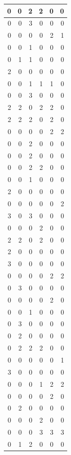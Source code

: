 \documentclass[
  12pt,
]{krantz}
\begin{document}
\begin{tabular}{r|r|r|r|r|r}
\hline
0 & 0 & 2 & 2 & 0 & 0\\
\hline
0 & 0 & 3 & 0 & 0 & 0\\
\hline
0 & 0 & 0 & 0 & 2 & 1\\
\hline
0 & 0 & 1 & 0 & 0 & 0\\
\hline
0 & 1 & 1 & 0 & 0 & 0\\
\hline
2 & 0 & 0 & 0 & 0 & 0\\
\hline
0 & 0 & 1 & 1 & 1 & 0\\
\hline
0 & 0 & 3 & 0 & 0 & 0\\
\hline
2 & 2 & 0 & 2 & 2 & 0\\
\hline
2 & 2 & 2 & 0 & 2 & 0\\
\hline
0 & 0 & 0 & 0 & 2 & 2\\
\hline
0 & 0 & 2 & 0 & 0 & 0\\
\hline
0 & 0 & 2 & 0 & 0 & 0\\
\hline
0 & 0 & 2 & 2 & 0 & 0\\
\hline
0 & 0 & 1 & 0 & 0 & 0\\
\hline
2 & 0 & 0 & 0 & 0 & 0\\
\hline
0 & 0 & 0 & 0 & 0 & 2\\
\hline
3 & 0 & 3 & 0 & 0 & 0\\
\hline
0 & 0 & 0 & 2 & 0 & 0\\
\hline
2 & 2 & 0 & 2 & 0 & 0\\
\hline
2 & 0 & 0 & 0 & 0 & 0\\
\hline
3 & 0 & 0 & 0 & 0 & 0\\
\hline
0 & 0 & 0 & 0 & 2 & 2\\
\hline
0 & 3 & 0 & 0 & 0 & 0\\
\hline
0 & 0 & 0 & 0 & 2 & 0\\
\hline
0 & 0 & 1 & 0 & 0 & 0\\
\hline
0 & 3 & 0 & 0 & 0 & 0\\
\hline
0 & 2 & 0 & 0 & 0 & 0\\
\hline
0 & 2 & 2 & 2 & 0 & 0\\
\hline
0 & 0 & 0 & 0 & 0 & 1\\
\hline
3 & 0 & 0 & 0 & 0 & 0\\
\hline
0 & 0 & 0 & 1 & 2 & 2\\
\hline
0 & 0 & 0 & 0 & 2 & 0\\
\hline
0 & 2 & 0 & 0 & 0 & 0\\
\hline
0 & 0 & 0 & 2 & 0 & 0\\
\hline
0 & 0 & 0 & 3 & 3 & 3\\
\hline
0 & 1 & 2 & 0 & 0 & 0\\

\end{tabular}
\end{document}
